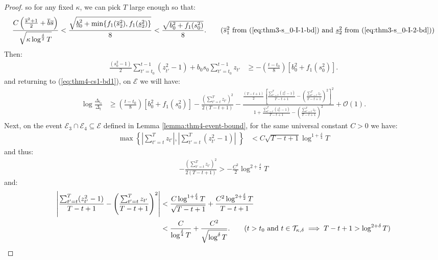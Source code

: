 \begin{proof}
so for any fixed $\kappa$, we can pick $T$ large enough so that:
\begin{align*}
    \frac{C \left(\frac{\overline{s}^2+1}{2} + \overline{b} \overline{s}\right)}{\sqrt{\kappa \log^{\frac{\delta}{2}}T}} < \frac{\sqrt{\underline{b}^2_0 + \min\{f_1(\overline{s}_2^2), f_1(\underline{s}_2^2)\}}}{8} < \frac{\sqrt{b^2_0 + f_1(s_0^2)}}{8}. \tag{$\overline{s}_1^2$ from (\ref{eq:thm3-s_0-I-1-bd}) and $\underline{s}_2^2$ from (\ref{eq:thm3-s_0-I-2-bd})}
\end{align*}
Then:
\begin{align*}
    \frac{(s_0^2-1)}{2} \sum_{t' = t_0}^{t - 1} (z_{t'}^2-1) + b_0 s_0 \sum_{t' = t_0}^{t - 1} z_{t'} &\geq -\left(\frac{t-t_0}{8}\right)\left[b_0^2 + f_1(s_0^2)\right]. 
\end{align*}
and returning to (\ref{eq:thm4-cs1-bd1}), on $\mathcal{E}$ we will have:
\begin{align}
    \log \frac{\Delta_{t_0}}{\Delta_t} &\geq \left(\frac{t-t_0}{8}\right)\left[b_0^2 + f_1(s_0^2)\right] - \frac{\left(\sum_{t'=t}^T z_{t'}\right)^2}{2(T-t+1)} - \frac{\frac{(T-t+1)}{2}\left[\frac{\sum_{t'=t}^T (z_{t'}^2-1)}{T-t+1} - \left(\frac{\sum_{t'=t}^T z_{t'}}{T-t+1}\right)^2 \right]^2}{1 + \frac{\sum_{t'=t}^T (z_{t'}^2-1)}{T-t+1} - \left(\frac{\sum_{t'=t}^T z_{t'}}{T-t+1}\right)^2 } + \mathcal{O}(1). \label{eq:thm4-cs1-bd2} 
\end{align}
Next, on the event $\mathcal{E}_3\cap\mathcal{E}_4 \subseteq\mathcal{E}$ defined in Lemma \ref{lemma:thm4-event-bound}, for the same universal constant $C > 0$ we have:
\begin{align*}
    \max\left\{\left|\sum_{t' = t}^{T} z_{t'}\right|,\left|\sum_{t' = t}^{T} (z^2_{t'}-1)\right|\;\right\} &< C \sqrt{T-t+1}\log^{1 + \frac{\delta}{4}} T 
\end{align*}
and thus:
\begin{align*}
    -\frac{\left(\sum_{t'=t}^T z_{t'}\right)^2}{2(T-t+1)} > - \frac{C^2}{2}\log^{2+\frac{\delta}{2}} T
\end{align*}
and:
\begin{align*}
     \left|\frac{\sum_{t'=t}^T (z_{t'}^2-1)}{T-t+1} - \left(\frac{\sum_{t'=t}^T z_{t'}}{T-t+1}\right)^2\right| &< \frac{C\log^{1 + \frac{\delta}{4}} T}{\sqrt{T-t+1}} + \frac{C^2 \log^{2 + \frac{\delta}{2}} T}{T-t+1} \\
     &< \frac{C}{\log^{\frac{\delta}{4}}T} + \frac{C^2}{\sqrt{\log^\delta T} }. \tag{$t> t_0$ and $t \in \mathcal{T}_{\kappa,\delta} \implies T-t+1 > \log^{2 + \delta} T$}
\end{align*}

\end{proof}
